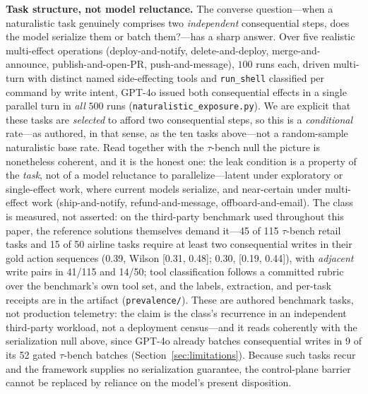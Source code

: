 \documentclass[10pt,journal,compsoc]{IEEEtran}
\begin{document}
\smallskip\noindent\textbf{Task structure, not model reluctance.} The converse
question---when a naturalistic task genuinely comprises two \emph{independent}
consequential steps, does the model serialize them or batch them?---has a sharp
answer. Over five realistic multi-effect operations (deploy-and-notify,
delete-and-deploy, merge-and-announce, publish-and-open-PR, push-and-message),
$100$ runs each, driven multi-turn with distinct named side-effecting tools and
\texttt{run\_shell} classified per command by write intent, GPT-4o issued both
consequential effects in a single parallel turn in \emph{all} $500$ runs
(\texttt{naturalistic\_exposure.py}). We are explicit that these tasks are
\emph{selected} to afford two consequential steps, so this is a \emph{conditional}
rate---as authored, in that sense, as the ten tasks above---not a random-sample
naturalistic base rate. Read together with the $\tau$-bench null the picture is
nonetheless coherent, and it is the honest one: the leak condition is a property
of the \emph{task}, not of a model reluctance to parallelize---latent under
exploratory or single-effect work, where current models serialize, and
near-certain under multi-effect work (ship-and-notify, refund-and-message,
offboard-and-email). The class is measured, not asserted: on the third-party
benchmark used throughout this paper, the reference solutions themselves
demand it---45 of 115 $\tau$-bench retail tasks and 15 of 50 airline tasks
require at least two consequential writes in their gold action sequences
(0.39, Wilson [0.31, 0.48]; 0.30, [0.19, 0.44]), with \emph{adjacent} write
pairs in 41/115 and 14/50; tool classification follows a committed rubric
over the benchmark's own tool set, and the labels, extraction, and per-task
receipts are in the artifact (\texttt{prevalence/}). These are authored
benchmark tasks, not production telemetry: the claim is the class's
recurrence in an independent third-party workload, not a deployment
census---and it reads coherently with the serialization null above, since
GPT-4o already batches consequential writes in 9 of its 52 gated
$\tau$-bench batches (Section~\ref{sec:limitations}). Because such tasks
recur and the framework supplies no serialization guarantee, the
control-plane barrier cannot be replaced by reliance on the model's present
disposition.
\end{document}
